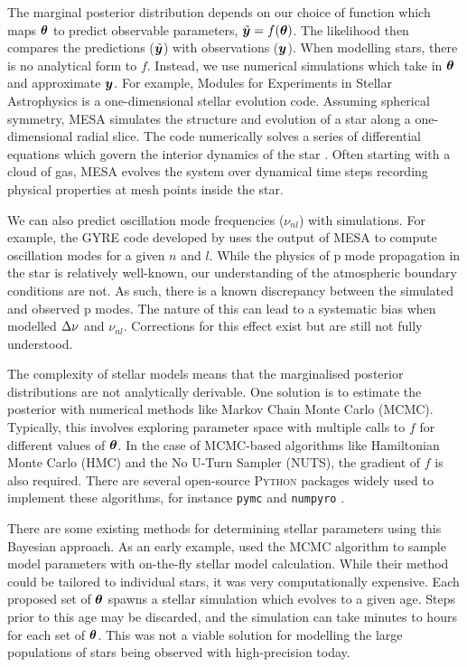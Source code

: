 The marginal posterior distribution depends on our choice of function which maps \(\bm{\theta}\) to predict observable parameters, \(\tilde{\bm{y}} = f(\bm{\theta})\). The likelihood then compares the predictions (\(\tilde{\bm{y}}\)) with observations (\(\bm{y}\)). When modelling stars, there is no analytical form to \(f\). Instead, we use numerical simulations which take in \(\bm{\theta}\) and approximate \(\bm{y}\). For example, Modules for Experiments in Stellar Astrophysics \citep[MESA; originally developed by][]{Paxton.Bildsten.ea2011} is a one-dimensional stellar evolution code. Assuming spherical symmetry, MESA simulates the structure and evolution of a star along a one-dimensional radial slice. The code numerically solves a series of differential equations which govern the interior dynamics of the star \citep[see, e.g.][for an introduction to stellar structure and evolution]{Kippenhahn.Weigert.ea2013}. Often starting with a cloud of gas, MESA evolves the system over dynamical time steps recording physical properties at mesh points inside the star.

We can also predict oscillation mode frequencies (\(\nu_{nl}\)) with simulations. For example, the GYRE code developed by \citet{Townsend.Teitler2013} uses the output of MESA to compute oscillation modes for a given \(n\) and \(l\). While the physics of p mode propagation in the star is relatively well-known, our understanding of the atmospheric boundary conditions are not. As such, there is a known discrepancy between the simulated and observed p modes. The nature of this can lead to a systematic bias when modelled \({\Delta\nu}\) and \(\nu_{nl}\). Corrections for this effect exist \citep[e.g.][]{Ball.Gizon2014} but are still not fully understood.

The complexity of stellar models means that the marginalised posterior distributions are not analytically derivable. One solution is to estimate the posterior with numerical methods like Markov Chain Monte Carlo (MCMC). Typically, this involves exploring parameter space with multiple calls to \(f\) for different values of \(\bm{\theta}\). In the case of MCMC-based algorithms like Hamiltonian Monte Carlo (HMC) and the No U-Turn Sampler (NUTS), the gradient of \(f\) is also required. There are several open-source \textsc{Python} packages widely used to implement these algorithms, for instance \texttt{pymc} \citep{Salvatier.Wiecki.ea2016} and \texttt{numpyro} \citep{Phan.Pradhan.ea2019}.

There are some existing methods for determining stellar parameters using this Bayesian approach. As an early example, \citet{Bazot.Bourguignon.ea2008} used the MCMC algorithm to sample model parameters with on-the-fly stellar model calculation. While their method could be tailored to individual stars, it was very computationally expensive. Each proposed set of \(\bm{\theta}\) spawns a stellar simulation which evolves to a given age. Steps prior to this age may be discarded, and the simulation can take minutes to hours for each set of \(\bm{\theta}\). This was not a viable solution for modelling the large populations of stars being observed with high-precision today.

